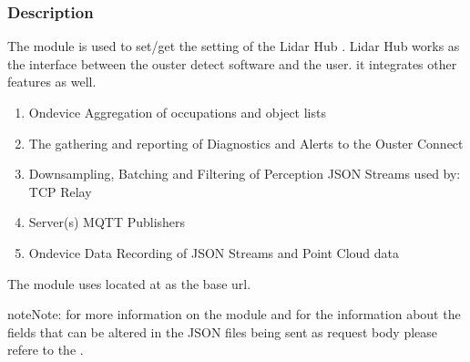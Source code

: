 \documentclass[letterpaper,10pt,english]{sphinxmanual}
\begin{document}
\subsubsection{Description}
\label{\detokenize{gemini_lidar_hub_API:description}}
\sphinxAtStartPar
The module is used to set/get the setting of the Lidar Hub .
Lidar Hub works as the interface between the ouster detect software and the user. it integrates other features as well.
\begin{enumerate}
%
\item {} 
\sphinxAtStartPar
On\sphinxhyphen{}device Aggregation of occupations and object lists

\item {} 
\sphinxAtStartPar
The gathering and reporting of Diagnostics and Alerts to the Ouster Connect

\item {} 
\sphinxAtStartPar
Down\sphinxhyphen{}sampling, Batching and Filtering of Perception JSON Streams used by: \sphinxhyphen{} TCP Relay

\item {} 
\sphinxAtStartPar
Server(s) \sphinxhyphen{} MQTT Publishers

\item {} 
\sphinxAtStartPar
On\sphinxhyphen{}device Data Recording of JSON Streams and Point Cloud data

\end{enumerate}

\sphinxAtStartPar
The module uses  located at {\hyperref[\detokenize{gemini_login::doc}]{}} as the base url.

\begin{sphinxadmonition}{note}{Note:}
\sphinxAtStartPar
for more information on the module and for the information about the fields that can be altered in the
JSON files being sent as request body please refere to the .
\end{sphinxadmonition}
\label{\detokenize{gemini_lidar_hub_API:module-gemini_lidar_hub_API}}
\end{document}
